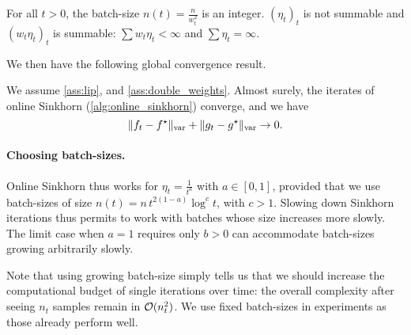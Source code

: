 \begin{assumption}\label{ass:double_weights}
    For all $t > 0$, the batch-size $n(t) = \frac{n}{w_t^2}$ is an integer. ${(\eta_t)}_t$ is
    not summable and ${(w_t \eta_t)}_t$ is summable: $\sum w_t \eta_t <
    \infty$ and $\sum \eta_t = \infty$.
\end{assumption}
We then have the following global convergence result.

\begin{proposition}\label{prop:convergence_true}
    We assume \autoref{ass:lip}, and
    \ref{ass:double_weights}. Almost surely, the iterates of online Sinkhorn
    (\autoref{alg:online_sinkhorn}) converge, and we have
    \begin{equation}
        \Vert f_t - f^\star \Vert_{\text{\upshape var}} + \Vert g_t - g^\star \Vert_{\text{\upshape var}} \to 0.
    \end{equation}
\end{proposition}

\paragraph{Choosing batch-sizes.}

Online Sinkhorn thus works for $\eta_t = \frac{1}{t^a}$ with $a \in [0, 1]$,
provided that we use batch-sizes of size $n(t) = n\, t^{2(1-a)} \log^c t$, with $c >
1$. Slowing down Sinkhorn iterations thus permits to work with batches whose
size increases more slowly. The limit case when $a = 1$ requires only $b > 0$
can accommodate batch-sizes growing arbitrarily slowly. 

Note that using growing batch-size simply tells us that we should increase the
computational budget of single iterations over time: the overall complexity
after seeing $n_t$ samples remain in $\mathcal{O}(n_t^2)$. We use fixed batch-sizes in
experiments as those already perform well.